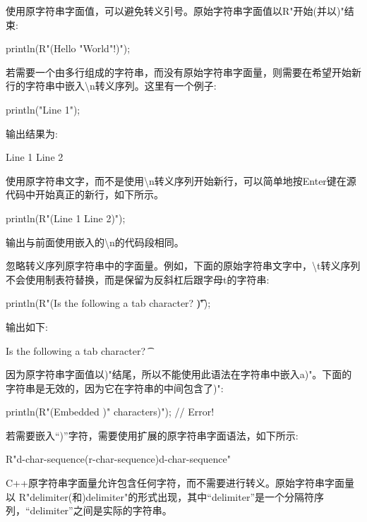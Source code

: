 使用原字符串字面值，可以避免转义引号。原始字符串字面值以R"开始(并以)"结束:

\begin{cpp}
println(R"(Hello "World"!)");
\end{cpp}

若需要一个由多行组成的字符串，而没有原始字符串字面量，则需要在希望开始新行的字符串中嵌入\textbackslash{}n转义序列。这里有一个例子:

\begin{cpp}
println("Line 1");
\end{cpp}

输出结果为:

\begin{shell}
Line 1
Line 2
\end{shell}

使用原字符串文字，而不是使用\textbackslash{}n转义序列开始新行，可以简单地按Enter键在源代码中开始真正的新行，如下所示。

\begin{cpp}
println(R"(Line 1
Line 2)");
\end{cpp}

输出与前面使用嵌入的\textbackslash{}n的代码段相同。

忽略转义序列原字符串中的字面量。例如，下面的原始字符串文字中，\textbackslash{}t转义序列不会使用制表符替换，而是保留为反斜杠后跟字母t的字符串:

\begin{cpp}
println(R"(Is the following a tab character? \t)");
\end{cpp}

输出如下:

\begin{shell}
Is the following a tab character? \t
\end{shell}

因为原字符串字面值以)"结尾，所以不能使用此语法在字符串中嵌入a)"。下面的字符串是无效的，因为它在字符串的中间包含了)":

\begin{cpp}
println(R"(Embedded )" characters)"); // Error!
\end{cpp}

若需要嵌入“)”字符，需要使用扩展的原字符串字面语法，如下所示:

\begin{cpp}
R"d-char-sequence(r-char-sequence)d-char-sequence"
\end{cpp}

C++原字符串字面量允许包含任何字符，而不需要进行转义。原始字符串字面量以 R"delimiter(和)delimiter"的形式出现，其中“delimiter”是一个分隔符序列，“delimiter”之间是实际的字符串。

